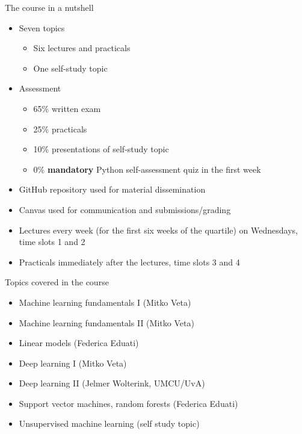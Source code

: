 \documentclass[notes]{beamer}          %
\begin{document}
\begin{frame}{The course in a nutshell}
\begin{itemize}
    \item Seven topics
    \begin{itemize}
        \item Six lectures and practicals
        \item One self-study topic
    \end{itemize}
    \item{Assessment}
        \begin{itemize}
            \item 65\% written exam
            \item 25\% practicals
            \item 10\% presentations of self-study topic
            \item 0\% \textbf{mandatory} Python self-assessment quiz in the first week
        \end{itemize}
    \item GitHub repository used for material dissemination
    \item Canvas used for communication and submissions/grading
    \item Lectures every week (for the first six weeks of the quartile) on Wednesdays, time slots 1 and 2 
    \item Practicals immediately after the lectures, time slots 3 and 4
    
\end{itemize}
\end{frame}

\begin{frame}{Topics covered in the course}
\begin{itemize}
    \item Machine learning fundamentals I (Mitko Veta)
    \item Machine learning fundamentals II (Mitko Veta)
    \item Linear models (Federica Eduati)
    \item Deep learning I (Mitko Veta)
    \item Deep learning II (Jelmer Wolterink, UMCU/UvA)
    \item Support vector machines, random forests (Federica Eduati)
    \item Unsupervised machine learning (self study topic)
\end{itemize}
\end{frame}
\end{document}
